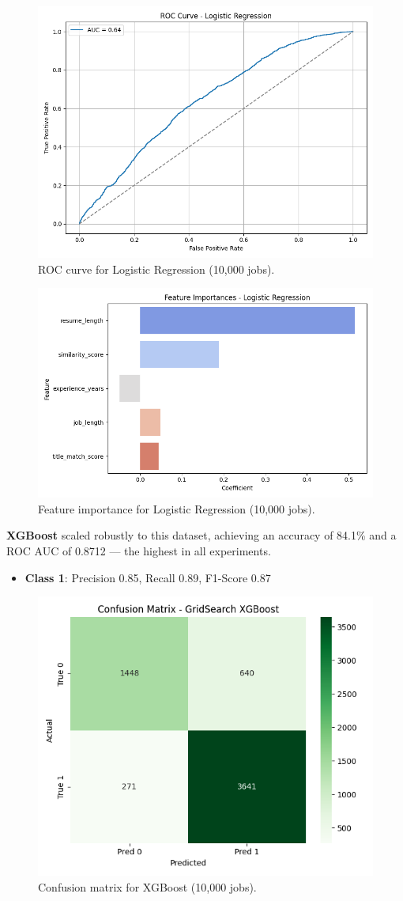 \documentclass[a4paper]{article}
\begin{document}
\begin{multicols}{2}
\begin{figure}[H]
\centering
\includegraphics[width=0.7\linewidth]{Images/roc_logreg_10000.png}
\caption{ROC curve for Logistic Regression (10,000 jobs).}
\end{figure}

\begin{figure}[H]
\centering
\includegraphics[width=0.8\linewidth]{Images/featimp_logreg_10000.png}
\caption{Feature importance for Logistic Regression (10,000 jobs).}
\end{figure}

\textbf{XGBoost} scaled robustly to this dataset, achieving an accuracy of 84.1\% and a ROC AUC of 0.8712 — the highest in all experiments.

\begin{itemize}
    \item \textbf{Class 1}: Precision 0.85, Recall 0.89, F1-Score 0.87
\end{itemize}

\begin{figure}[H]
\centering
\includegraphics[width=0.55\linewidth]{Images/conf_matrix_xgb_10000.png}
\caption{Confusion matrix for XGBoost (10,000 jobs).}
\end{figure}


\end{multicols}
\end{document}
